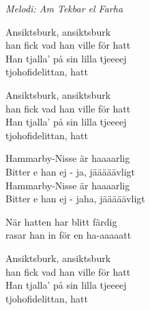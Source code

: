 {\footnotesize\textit{Melodi: Am Tekbar el Farha}}\par
\vspace{10pt}
Ansiktsburk, ansiktsburk\\
han fick vad han ville för hatt\\
Han tjalla' på sin lilla tjeeeej\\
tjohofidelittan, hatt\par
\vspace{10pt}
Ansiktsburk, ansiktsburk\\
han fick vad han ville för hatt\\
Han tjalla' på sin lilla tjeeeej\\
tjohofidelittan, hatt\par
\vspace{10pt}
Hammarby-Nisse är haaaarlig\\
Bitter e han ej - ja, jääääävligt\\
Hammarby-Nisse är haaaarlig\\
Bitter e han ej - jaha, jääääävligt\par
\vspace{10pt}
När hatten har blitt färdig\\
rasar han in för en ha-aaaaatt\par
\vspace{10pt}
Ansiktsburk, ansiktsburk\\
han fick vad han ville för hatt\\
Han tjalla' på sin lilla tjeeeej\\
tjohofidelittan, hatt
